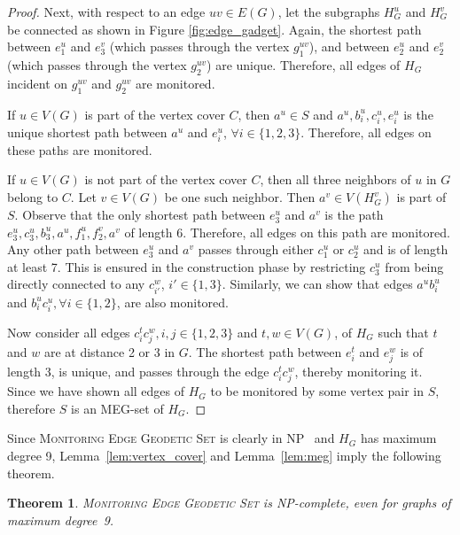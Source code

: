 \documentclass[10pt,a4paper]{article}
\newtheorem{theorem}{Theorem}[section]
\begin{document}
\begin{proof}
    Next, with respect to an edge $uv \in E(G)$, let the subgraphs $H_G^u$ and $H_G^v$ be connected as shown in Figure \ref{fig:edge_gadget}. Again, the shortest path between $e_1^u$ and $e_3^v$ (which passes through the vertex $g_1^{uv}$), and between $e_2^u$ and $e_2^v$ (which passes through the vertex $g_2^{uv}$) are unique. Therefore, all edges of $H_G$ incident on $g_1^{uv}$ and $g_2^{uv}$ are monitored.

    If $u \in V(G)$ is part of the vertex cover $C$, then $a^u \in S$ and $a^u, b_i^u, c_i^u, e_i^u$ is the unique shortest path between $a^u$ and $e_i^u$, $\forall i \in \{1,2,3\}$. Therefore, all edges on these paths are monitored.

    If $u \in V(G)$ is not part of the vertex cover $C$, then all three neighbors of $u$ in $G$ belong to $C$. Let $v \in V(G)$ be one such neighbor. Then $a^v \in V(H_G^v)$ is part of $S$. Observe that the only shortest path between $e_3^u$ and $a^v$ is the path $e_3^u, c_3^u, b_3^u, a^u, f_1^u, f_2^v, a^v$ of length 6. Therefore, all edges on this path are monitored. Any other path between $e_3^u$ and $a^v$ passes through either $c_1^u$ or $c_2^u$ and is of length at least 7. This is ensured in the construction phase by restricting $c_3^u$ from being directly connected to any $c_{i'}^w$, $i' \in \{1, 3\}$. Similarly, we can show that edges $a^u b_i^u$ and $b_i^u c_i^u, \forall i \in \{1,2\}$, are also monitored.
    
    Now consider all edges $c_i^t c_j^w, i, j \in \{1,2,3\}$ and $t, w \in V(G)$, of $H_G$ such that $t$ and $w$ are at distance 2 or 3 in $G$. The shortest path between $e_i^t$ and $e_j^w$ is of length 3, is unique, and passes through the edge $c_i^t c_j^w$, thereby monitoring it. Since we have shown all edges of $H_G$ to be monitored by some vertex pair in $S$, therefore $S$ is an MEG-set of $H_G$.
\end{proof}

Since \textsc{Monitoring Edge Geodetic Set} is clearly in NP~\cite{H23} and $H_G$ has maximum degree 9, Lemma~\ref{lem:vertex_cover} and Lemma~\ref{lem:meg} imply the following theorem.

\begin{theorem}
    \textsc{Monitoring Edge Geodetic Set} is NP-complete, even for graphs of maximum degree~9.
\end{theorem}
\end{document}
